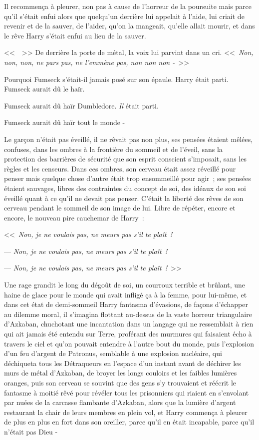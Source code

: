 Il recommença à pleurer, non pas à cause de l'horreur de la poursuite mais parce qu'il s'était enfui alors que quelqu'un derrière lui appelait à l'aide, lui criait de revenir et de la sauver, de l'aider, qu'on la mangeait, qu'elle allait mourir, et dans le rêve Harry s'était enfui au lieu de la sauver.

<<~~>> De derrière la porte de métal, la voix lui parvint dans un cri. <<~\emph{Non, non, non, ne pars pas, ne l'emmène pas, non non non -}~>>

Pourquoi Fumseck s'était-il jamais posé sur son épaule. Harry était parti. Fumseck aurait dû le haïr.

Fumseck aurait dû haïr Dumbledore. \emph{Il} était parti.

Fumseck aurait dû haïr tout le monde -

Le garçon n'était pas éveillé, il ne rêvait pas non plus, ses pensées étaient mêlées, confuses, dans les ombres à la frontière du sommeil et de l'éveil, sans la protection des barrières de sécurité que son esprit conscient s'imposait, sans les règles et les censeurs. Dans ces ombres, son cerveau était assez réveillé pour penser mais quelque chose d'autre était trop ensommeillé pour agir~; ses pensées étaient sauvages, libres des contraintes du concept de soi, des idéaux de son soi éveillé quant à ce qu'il ne devait pas penser. C'était la liberté des rêves de son cerveau pendant le sommeil de son image de lui. Libre de répéter, encore et encore, le nouveau pire cauchemar de Harry~:

<<~\emph{Non, je ne voulais pas, ne meurs pas s'il te plaît~!}

--- \emph{Non, je ne voulais pas, ne meurs pas s'il te plaît~!}

--- \emph{Non, je ne voulais pas, ne meurs pas s'il te plaît~!}~>>

Une rage grandit le long du dégoût de soi, un courroux terrible et brûlant, une haine de glace pour le monde qui avait infligé ça à la femme, pour lui-même, et dans cet état de demi-sommeil Harry fantasma d'évasions, de façons d'échapper au dilemme moral, il s'imagina flottant au-dessus de la vaste horreur triangulaire d'Azkaban, chuchotant une incantation dans un langage qui ne ressemblait à rien qui ait jamais été entendu sur Terre, proférant des murmures qui faisaient écho à travers le ciel et qu'on pouvait entendre à l'autre bout du monde, puis l'explosion d'un feu d'argent de Patronus, semblable à une explosion nucléaire, qui déchiqueta tous les Détraqueurs en l'espace d'un instant avant de déchirer les murs de métal d'Azkaban, de broyer les longs couloirs et les faibles lumières oranges, puis son cerveau se souvint que des gens s'y trouvaient et réécrit le fantasme à moitié rêvé pour révéler tous les prisonniers qui riaient en s'envolant par nuées de la carcasse flambante d'Azkaban, alors que la lumière d'argent restaurant la chair de leurs membres en plein vol, et Harry commença à pleurer de plus en plus en fort dans son oreiller, parce qu'il en était incapable, parce qu'il n'était pas Dieu -

